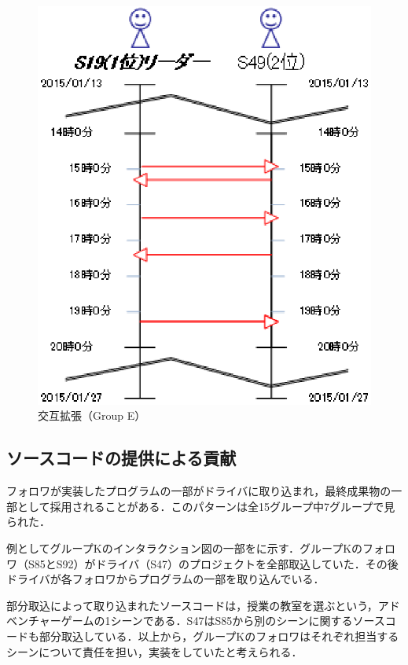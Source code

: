 \begin{figure}[tb]
	\begin{center}
		\includegraphics[scale=0.5]{img/flowE.eps}
		\caption{交互拡張（Group E）}
		\label{fig:flowE}
	\end{center}
\end{figure}

\subsection{ソースコードの提供による貢献}

フォロワが実装したプログラムの一部がドライバに取り込まれ，最終成果物の一部として採用されることがある．このパターンは全15グループ中7グループで見られた．

例としてグループKのインタラクション図の一部をに示す．グループKのフォロワ（S85とS92）がドライバ（S47）のプロジェクトを全部取込していた．その後ドライバが各フォロワからプログラムの一部を取り込んでいる．

部分取込によって取り込まれたソースコードは，授業の教室を選ぶという，アドベンチャーゲームの1シーンである．S47はS85から別のシーンに関するソースコードも部分取込している．以上から，グループKのフォロワはそれぞれ担当するシーンについて責任を担い，実装をしていたと考えられる．



